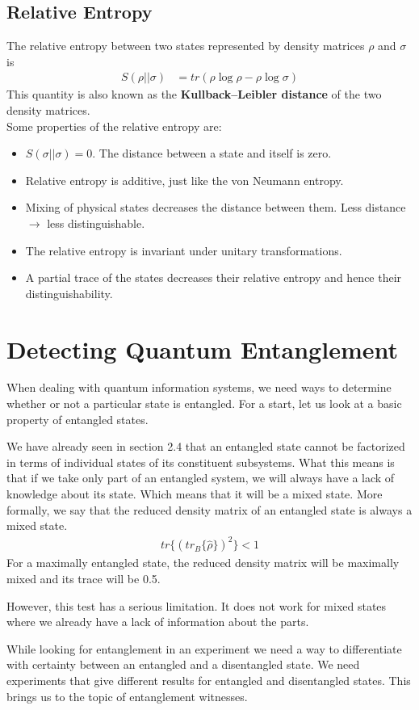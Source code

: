 \subsection{Relative Entropy}
\par The relative entropy between two states represented by density matrices $\rho$ and $\sigma$ is
\begin{align*}
S(\rho||\sigma) &= tr ( \rho \log \rho - \rho \log \sigma )
\end{align*}
This quantity is also known as the \textbf{Kullback–Leibler distance} of the two density matrices.
\\ Some properties of the relative entropy are:
\begin{itemize}
  \item $S(\sigma||\sigma) = 0$. The distance between a state and itself is zero.
  \item Relative entropy is additive, just like the von Neumann entropy.
  \item Mixing of physical states decreases the distance between them. Less distance $\rightarrow$ less distinguishable.
  \item The relative entropy is invariant under unitary transformations.
  \item A partial trace of the states decreases their relative entropy and hence their distinguishability.
\end{itemize}

\section{Detecting Quantum Entanglement}
\par When dealing with quantum information systems, we need ways to determine whether or not a particular state is entangled. For a start, let us look at a basic property of entangled states.
\par We have already seen in section 2.4 that an entangled state cannot be factorized in terms of individual states of its constituent subsystems. What this means is that if we take only part of an entangled system, we will always have a lack of knowledge about its state. Which means that it will be a mixed state. More formally, we say that the reduced density matrix of an entangled state is always a mixed state.
\begin{align*}
tr \{ ( tr_B \{\hat{\rho}\} )^2 \} < 1
\end{align*}
For a maximally entangled state, the reduced density matrix will be maximally mixed and its trace will be 0.5.
\par However, this test has a serious limitation. It does not work for mixed states where we already have a lack of information about the parts.
\par While looking for entanglement in an experiment we need a way to differentiate with certainty between an entangled and a disentangled state. We need experiments that give different results for entangled and disentangled states. This brings us to the topic of entanglement witnesses.
